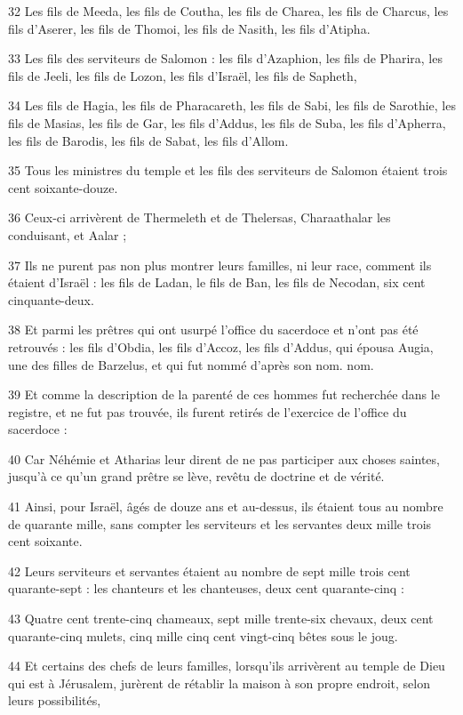 \par 32 Les fils de Meeda, les fils de Coutha, les fils de Charea, les fils de Charcus, les fils d'Aserer, les fils de Thomoi, les fils de Nasith, les fils d'Atipha.
\par 33 Les fils des serviteurs de Salomon : les fils d'Azaphion, les fils de Pharira, les fils de Jeeli, les fils de Lozon, les fils d'Israël, les fils de Sapheth,
\par 34 Les fils de Hagia, les fils de Pharacareth, les fils de Sabi, les fils de Sarothie, les fils de Masias, les fils de Gar, les fils d'Addus, les fils de Suba, les fils d'Apherra, les fils de Barodis, les fils de Sabat, les fils d'Allom.
\par 35 Tous les ministres du temple et les fils des serviteurs de Salomon étaient trois cent soixante-douze.
\par 36 Ceux-ci arrivèrent de Thermeleth et de Thelersas, Charaathalar les conduisant, et Aalar ;
\par 37 Ils ne purent pas non plus montrer leurs familles, ni leur race, comment ils étaient d'Israël : les fils de Ladan, le fils de Ban, les fils de Necodan, six cent cinquante-deux.
\par 38 Et parmi les prêtres qui ont usurpé l'office du sacerdoce et n'ont pas été retrouvés : les fils d'Obdia, les fils d'Accoz, les fils d'Addus, qui épousa Augia, une des filles de Barzelus, et qui fut nommé d'après son nom. nom.
\par 39 Et comme la description de la parenté de ces hommes fut recherchée dans le registre, et ne fut pas trouvée, ils furent retirés de l'exercice de l'office du sacerdoce :
\par 40 Car Néhémie et Atharias leur dirent de ne pas participer aux choses saintes, jusqu'à ce qu'un grand prêtre se lève, revêtu de doctrine et de vérité.
\par 41 Ainsi, pour Israël, âgés de douze ans et au-dessus, ils étaient tous au nombre de quarante mille, sans compter les serviteurs et les servantes deux mille trois cent soixante.
\par 42 Leurs serviteurs et servantes étaient au nombre de sept mille trois cent quarante-sept : les chanteurs et les chanteuses, deux cent quarante-cinq :
\par 43 Quatre cent trente-cinq chameaux, sept mille trente-six chevaux, deux cent quarante-cinq mulets, cinq mille cinq cent vingt-cinq bêtes sous le joug.
\par 44 Et certains des chefs de leurs familles, lorsqu'ils arrivèrent au temple de Dieu qui est à Jérusalem, jurèrent de rétablir la maison à son propre endroit, selon leurs possibilités,
